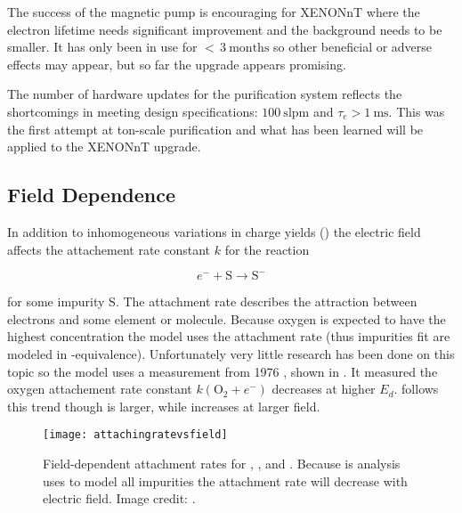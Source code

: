The success of the magnetic pump is encouraging for XENONnT where the electron lifetime needs significant improvement and the background
needs to be smaller.  It has only been in use for ${<}\, 3\ \mathrm{months}$ so other beneficial or adverse effects may appear, but so
far the upgrade appears promising.

The number of hardware updates for the purification system reflects the shortcomings in meeting design specifications:
$100\ \mathrm{slpm}$ and $\tau_e > 1\ \mathrm{ms}$.  This was the first attempt at ton-scale purification and what has been learned will
be applied to the XENONnT upgrade.



\subsection{Field Dependence}
\label{subsec:electron_lifetime_model_field}
In addition to inhomogeneous variations in charge yields () the electric field affects
the attachement rate constant $k$ for the reaction

\vspace{-15pt}

\begin{equation}
e^- + \mathrm{S} \rightarrow \mathrm{S^-}
\end{equation}

\vspace{-10pt}

\noindent for some impurity S.  The attachment rate describes the attraction between electrons and some element or molecule.  Because
oxygen is expected to have the highest concentration the model uses the  attachment rate (thus impurities fit are modeled
in -equivalence).  Unfortunately very little research has been done on this topic so the model uses a measurement from
1976 , shown in .  It measured the oxygen attachement rate
constant $k(\mathrm{O_2} + e^-)$ decreases at higher $E_d$.   follows this trend though is larger, while
 increases at larger field.

\begin{figure}
\centering
\texttt{[image: attachingratevsfield]}
\caption{Field-dependent attachment rates for , , and .  Because is analysis uses  to model all
impurities the attachment rate will decrease with electric field.  Image credit: .}
\label{fig:electron_lifetime_model_field_attaching_rate}
\end{figure}

